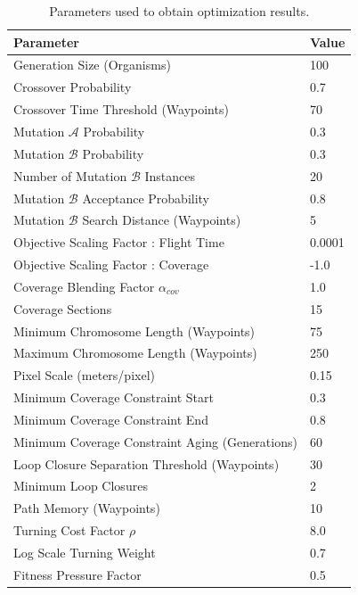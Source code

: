 \documentclass[letterpaper, 10 pt, conference]{ieeeconf}  %
\begin{document}
\begin{table}
  \centering
  \caption{Parameters used to obtain optimization results.}
\begin{tabular}{l|l}
\hline
\multicolumn{1}{|l|}{Parameter}                 & \multicolumn{1}{l|}{Value} \\ \hline
Generation Size (Organisms)                        & 100                     \\
Crossover Probability                              & 0.7                     \\
Crossover Time Threshold (Waypoints)               & 70                      \\
Mutation $\mathcal{A}$ Probability                 & 0.3                     \\
Mutation $\mathcal{B}$ Probability                 & 0.3                     \\
Number of Mutation $\mathcal{B}$ Instances         & 20                      \\
Mutation $\mathcal{B}$ Acceptance Probability      & 0.8                     \\
Mutation $\mathcal{B}$ Search Distance (Waypoints) & 5                       \\
Objective Scaling Factor : Flight Time             & 0.0001                  \\
Objective Scaling Factor : Coverage                & -1.0                    \\
Coverage Blending Factor $\alpha_{cov}$            & 1.0                     \\
Coverage Sections                                  & 15                      \\
Minimum Chromosome Length (Waypoints)              & 75                      \\
Maximum Chromosome Length (Waypoints)              & 250                     \\
Pixel Scale (meters/pixel)                         & 0.15                    \\
Minimum Coverage Constraint Start                  & 0.3                     \\
Minimum Coverage Constraint End                    & 0.8                     \\
Minimum Coverage Constraint Aging (Generations)    & 60                      \\
Loop Closure Separation Threshold (Waypoints)      & 30                      \\
Minimum Loop Closures                              & 2                       \\
Path Memory (Waypoints)                            & 10                      \\
Turning Cost Factor $\rho$                         & 8.0                     \\
Log Scale Turning Weight                           & 0.7                     \\
Fitness Pressure Factor                            & 0.5                     \\


\end{tabular}
\end{table}
\end{document}
